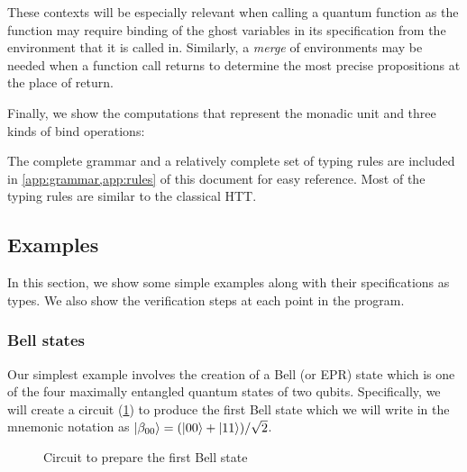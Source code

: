 \documentclass[adraft,creativecommons]{eptcs}
\theoremstyle{definition}
\theoremstyle{remark}
\begin{document}

These contexts will be especially relevant when calling a quantum function as the function may require binding of the ghost variables in its specification from the environment that it is called in. Similarly, a \textit{merge} of environments may be needed when a function call returns to determine the most precise propositions at the place of return.

Finally, we show the computations that represent the monadic unit and three kinds of bind operations:


The complete grammar and a relatively complete set of typing rules are included in \cref{app:grammar,app:rules} of this document for easy reference. Most of the typing rules are similar to the classical HTT.

\subsection{Examples}

In this section, we show some simple examples along with their specifications as types. We also show the verification steps at each point in the program.

\subsubsection{Bell states}

Our simplest example involves the creation of a Bell (or EPR) state which is one of the four maximally entangled quantum states of two qubits. Specifically, we will create a circuit (\cref{fig:bell00}) to produce the first Bell state which we will write in the mnemonic notation as $\ket{\beta_{00}} = (\ket{00}+\ket{11})/\sqrt{2}$.

\begin{figure}[t]
    \centering
    \caption{Circuit to prepare the first Bell state}
    \label{fig:bell00}
\end{figure}
\end{document}
